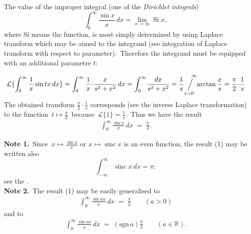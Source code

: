\documentclass[12pt]{article}
\DeclareMathOperator{\Si}{Si}
\newcommand{\sijoitus}[2]%
{\operatornamewithlimits{\Big/}_{\!\!\!#1}^{\,#2}}
\theoremstyle{definition}
\begin{document}
The value of the improper integral (one of the {\em Dirichlet integrals})
  $$\int_0^\infty \frac{\sin{x}}{x}\,dx = \lim_{x\to\infty}\Si{x},$$
where Si means the  function, is most simply determined by using Laplace transform which may be aimed to the integrand (see integration of Laplace transform with respect to parameter).\, Therefore the integrand must be equipped with an additional parametre $t$:

$$\mathcal{L}\{\int_0^\infty \frac{1}{x}\sin{tx}\,dx\} = 
\int_0^\infty\frac{1}{x}\!\cdot\!\frac{x}{s^2+x^2}\,dx = 
\int_0^\infty\!\frac{dx}{s^2+x^2} = 
\frac{1}{s}\!\sijoitus{x = 0}{\quad\infty}\!\arctan{\frac{x}{s}} = \frac{\pi}{2}\!\cdot\!\frac{1}{s}$$
The obtained transform $\frac{\pi}{2}\!\cdot\!\frac{1}{s}$ corresponds (see the inverse Laplace transformation) to the  function \,$t\mapsto\frac{\pi}{2}$\, because 
\,$\mathcal{L}\{1\} = \frac{1}{s}$.\, Thus we have the result 
\begin{align}
\int_0^\infty \frac{\sin{x}}{x}\,dx \;=\; \frac{\pi}{2}.
\end{align}


\textbf{Note 1.}\, Since\, $x\mapsto \frac{\sin{x}}{x}$\; or\; $x\mapsto\operatorname{sinc}{x}$\; is an even function, the result (1) may be written also
$$ \int_{-\infty}^\infty \operatorname{sinc}{x}\,dx=\pi;$$
see the .\\

\textbf{Note 2.}\, The result (1) may be easily generalised to
\begin{align}
\int_0^\infty \frac{\sin{ax}}{x}\,dx \;=\; \frac{\pi}{2} \qquad (a > 0)
\end{align}
and to
\begin{align}
\int_0^\infty \frac{\sin{ax}}{x}\,dx \;=\; (\mbox{sgn}\,a)\frac{\pi}{2} \qquad (a \in \mathbb{R}).
\end{align}


\end{document}
